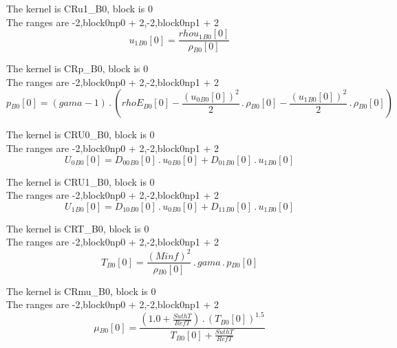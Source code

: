 \documentclass{article}
\begin{document}
\noindent The kernel is CRu1_B0, block is 0\\\noindent The ranges are -2,block0np0 + 2,-2,block0np1 + 2\\\begin{dmath}{u_{1}{_{B0}}}[{0}] = \frac{{rhou_{1}{_{B0}}}[{0}]}{{\rho{_{B0}}}[{0}]}\end{dmath}

\noindent The kernel is CRp_B0, block is 0\\\noindent The ranges are -2,block0np0 + 2,-2,block0np1 + 2\\\begin{dmath}{p{_{B0}}}[{0}] = \left(gama - 1\right) \,.\, \left({rhoE{_{B0}}}[{0}] - \frac{\left({u_{0}{_{B0}}}[{0}] \right)^{2}}{2} \,.\, {\rho{_{B0}}}[{0}] - \frac{\left({u_{1}{_{B0}}}[{0}] \right)^{2}}{2} \,.\, 
{\rho{_{B0}}}[{0}]\right)\end{dmath}

\noindent The kernel is CRU0_B0, block is 0\\\noindent The ranges are -2,block0np0 + 2,-2,block0np1 + 2\\\begin{dmath}{U_{0}{_{B0}}}[{0}] = {D_{00}{_{B0}}}[{0}] \,.\, {u_{0}{_{B0}}}[{0}] + {D_{01}{_{B0}}}[{0}] \,.\, {u_{1}{_{B0}}}[{0}]\end{dmath}

\noindent The kernel is CRU1_B0, block is 0\\\noindent The ranges are -2,block0np0 + 2,-2,block0np1 + 2\\\begin{dmath}{U_{1}{_{B0}}}[{0}] = {D_{10}{_{B0}}}[{0}] \,.\, {u_{0}{_{B0}}}[{0}] + {D_{11}{_{B0}}}[{0}] \,.\, {u_{1}{_{B0}}}[{0}]\end{dmath}

\noindent The kernel is CRT_B0, block is 0\\\noindent The ranges are -2,block0np0 + 2,-2,block0np1 + 2\\\begin{dmath}{T{_{B0}}}[{0}] = \frac{\left(Minf \right)^{2}}{{\rho{_{B0}}}[{0}]} \,.\, gama \,.\, {p{_{B0}}}[{0}]\end{dmath}

\noindent The kernel is CRmu_B0, block is 0\\\noindent The ranges are -2,block0np0 + 2,-2,block0np1 + 2\\\begin{dmath}{\mu{_{B0}}}[{0}] = \frac{\left(1.0 + \frac{SuthT}{RefT}\right) \,.\, \left({T{_{B0}}}[{0}] \right)^{1.5}}{{T{_{B0}}}[{0}] + \frac{SuthT}{RefT}}\end{dmath}
\end{document}
